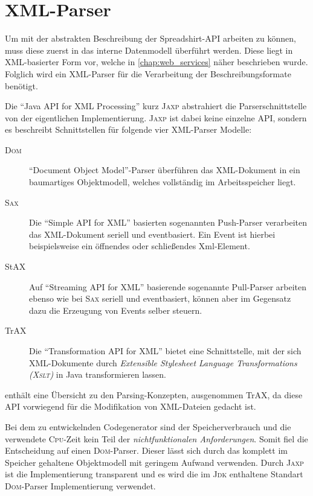 \section{XML-Parser}
\label{sec:xml_parser}

Um mit der abstrakten Beschreibung der Spreadshirt-\gls{API} arbeiten zu können, muss diese zuerst in das interne Datenmodell überführt werden. Diese liegt in \gls{XML}-basierter Form vor, welche in \cref{chap:web_services} näher beschrieben wurde. Folglich wird ein \gls{XML}-Parser für die Verarbeitung der Beschreibungsformate benötigt.  

Die \enquote{Java \gls{API} for \gls{XML} Processing} kurz \textsc{Jaxp} abstrahiert die Parserschnittstelle von der eigentlichen Implementierung. \textsc{Jaxp} ist dabei keine einzelne \gls{API}, sondern es beschreibt Schnittstellen für folgende vier \gls{XML}-Parser Modelle:

\begin{description}
    \item[\textsc{Dom}] \enquote{Document Object Model}-Parser überführen das \gls{XML}-Dokument in ein baumartiges Objektmodell, welches vollständig im Arbeitsspeicher liegt.
    \item[\textsc{Sax}] Die \enquote{Simple \gls{API} for \gls{XML}} basierten sogenannten Push-Parser verarbeiten das \gls{XML}-Dokument seriell und eventbasiert. Ein Event ist hierbei beispielsweise ein öffnendes oder schließendes Xml-Element.
    \item[StAX] Auf \enquote{Streaming \gls{API} for \gls{XML}} basierende sogenannte Pull-Parser arbeiten ebenso wie bei \textsc{Sax} seriell und eventbasiert, können aber im Gegensatz dazu die Erzeugung von Events selber steuern. 
    \item[TrAX] Die \enquote{Transformation \gls{API} for \gls{XML}} bietet eine Schnittstelle, mit der sich \gls{XML}-Dokumente durch \emph{Extensible Stylesheet Language Transformations (\textsc{Xslt})} in Java transformieren lassen.
\end{description}

 enthält eine Übersicht zu den Parsing-Konzepten, ausgenommen TrAX, da diese \gls{API} vorwiegend für die Modifikation von \gls{XML}-Dateien gedacht ist.

Bei dem zu entwickelnden Codegenerator sind der Speicherverbrauch und die verwendete \textsc{Cpu}-Zeit kein Teil der \emph{nichtfunktionalen Anforderungen}. Somit fiel die Entscheidung auf einen \textsc{Dom}-Parser. Dieser lässt sich durch das komplett im Speicher gehaltene Objektmodell mit geringem Aufwand verwenden. Durch \textsc{Jaxp} ist die Implementierung transparent und es wird die im \textsc{Jdk} enthaltene Standart \textsc{Dom}-Parser Implementierung verwendet.

